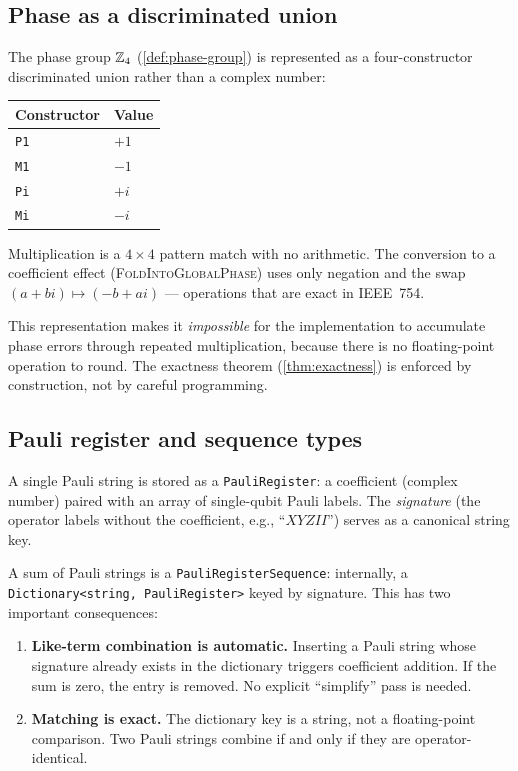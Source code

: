\subsection*{Phase as a discriminated union}

The phase group $\mathbb{Z}_4$ (\cref{def:phase-group}) is represented as a
four-constructor discriminated union rather than a complex number:

\begin{center}
\begin{tabular}{@{}ll@{}}
\toprule
\textbf{Constructor} & \textbf{Value} \\
\midrule
\texttt{P1} & $+1$ \\
\texttt{M1} & $-1$ \\
\texttt{Pi} & $+i$ \\
\texttt{Mi} & $-i$ \\
\bottomrule
\end{tabular}
\end{center}

Multiplication is a $4 \times 4$ pattern match with no arithmetic.
The conversion to a coefficient effect (\textsc{FoldIntoGlobalPhase})
uses only negation and the swap $(a + bi) \mapsto (-b + ai)$ ---
operations that are exact in IEEE~754.

This representation makes it \emph{impossible} for the implementation
to accumulate phase errors through repeated multiplication, because
there is no floating-point operation to round.  The exactness theorem
(\cref{thm:exactness}) is enforced by construction, not by careful
programming.

\subsection*{Pauli register and sequence types}

A single Pauli string is stored as a \texttt{PauliRegister}: a
coefficient (complex number) paired with an array of single-qubit
Pauli labels.  The \emph{signature} (the operator labels without the
coefficient, e.g., ``$XYZII$'') serves as a canonical string key.

A sum of Pauli strings is a \texttt{PauliRegisterSequence}: internally,
a \texttt{Dictionary<string, PauliRegister>} keyed by signature.  This
has two important consequences:

\begin{enumerate}
  \item \textbf{Like-term combination is automatic.}  Inserting a
    Pauli string whose signature already exists in the dictionary
    triggers coefficient addition.  If the sum is zero, the entry is
    removed.  No explicit ``simplify'' pass is needed.
  \item \textbf{Matching is exact.}  The dictionary key is a string,
    not a floating-point comparison.  Two Pauli strings combine if
    and only if they are operator-identical.
\end{enumerate}

